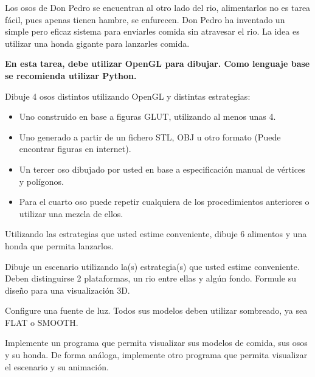 \documentclass[letterpaper,11pt]{article} %
\begin{document}




Los osos de Don Pedro se encuentran al otro lado del rio, alimentarlos no es tarea fácil, pues apenas tienen hambre, se enfurecen. Don Pedro ha inventado un simple pero eficaz sistema para enviarles comida sin atravesar el rio. La idea es utilizar una honda gigante para lanzarles comida. \\


\textbf{En esta tarea, debe utilizar OpenGL para dibujar. Como lenguaje base se recomienda utilizar Python.}


Dibuje 4 osos distintos utilizando OpenGL y distintas estrategias:

\begin{itemize}
	\item Uno construido en base a figuras GLUT, utilizando al menos unas 4.
	\item Uno generado a partir de un fichero STL, OBJ u otro formato (Puede encontrar figuras en internet).
	\item Un tercer oso dibujado por usted en base a especificación manual de vértices y polígonos.
	\item Para el cuarto oso puede repetir cualquiera de los procedimientos anteriores o utilizar una mezcla de ellos.
\end{itemize}

Utilizando las estrategias que usted estime conveniente, dibuje 6 alimentos y una honda que permita lanzarlos.

\newp Dibuje un escenario utilizando la(s) estrategia(s) que usted estime conveniente. Deben distinguirse 2 plataformas, un rio entre ellas y algún fondo. Formule su diseño para una visualización 3D.

\newp Configure una fuente de luz. Todos sus modelos deben utilizar sombreado, ya sea FLAT o SMOOTH.

\newp Implemente un programa que permita visualizar sus modelos de comida, sus osos y su honda. De forma análoga, implemente otro programa que permita visualizar el escenario y su animación.

\end{document}
